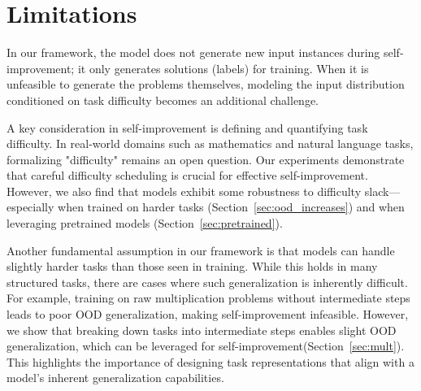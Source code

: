 \section{Limitations}\label{sec:discussion}
In our framework, the model does not generate new input instances during self-improvement; it only generates solutions (labels) for training. When it is unfeasible to generate the problems themselves, modeling the input distribution conditioned on task difficulty becomes an additional challenge.

A key consideration in self-improvement is defining and quantifying task difficulty. In real-world domains such as mathematics and natural language tasks, formalizing "difficulty" remains an open question. Our experiments demonstrate that careful difficulty scheduling is crucial for effective self-improvement. However, we also find that models exhibit some robustness to difficulty slack—especially when trained on harder tasks (Section~\ref{sec:ood_increases}) and when leveraging pretrained models (Section~\ref{sec:pretrained}). %

Another fundamental assumption in our framework is that models can handle slightly harder tasks than those seen in training. While this holds in many structured tasks, there are cases where such generalization is inherently difficult. For example, training on raw multiplication problems without intermediate steps leads to poor OOD generalization, making self-improvement infeasible. However, we show that breaking down tasks into intermediate steps enables slight OOD generalization, which can be leveraged for self-improvement(Section~\ref{sec:mult}). This highlights the importance of designing task representations that align with a model’s inherent generalization capabilities.





